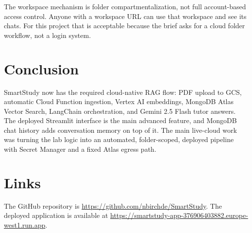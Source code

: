 \documentclass[11pt,a4paper]{article}
\begin{document}
The workspace mechanism is folder compartmentalization, not full account-based access control. Anyone with a workspace URL can use that workspace and see its chats. For this project that is acceptable because the brief asks for a cloud folder workflow, not a login system.

\section*{Conclusion}

SmartStudy now has the required cloud-native RAG flow: PDF upload to GCS, automatic Cloud Function ingestion, Vertex AI embeddings, MongoDB Atlas Vector Search, LangChain orchestration, and Gemini 2.5 Flash tutor answers. The deployed Streamlit interface is the main advanced feature, and MongoDB chat history adds conversation memory on top of it. The main live-cloud work was turning the lab logic into an automated, folder-scoped, deployed pipeline with Secret Manager and a fixed Atlas egress path.

\section*{Links}

The GitHub repository is \url{https://github.com/nbirchde/SmartStudy}. The deployed application is available at \url{https://smartstudy-app-376906403882.europe-west1.run.app}.
\end{document}
